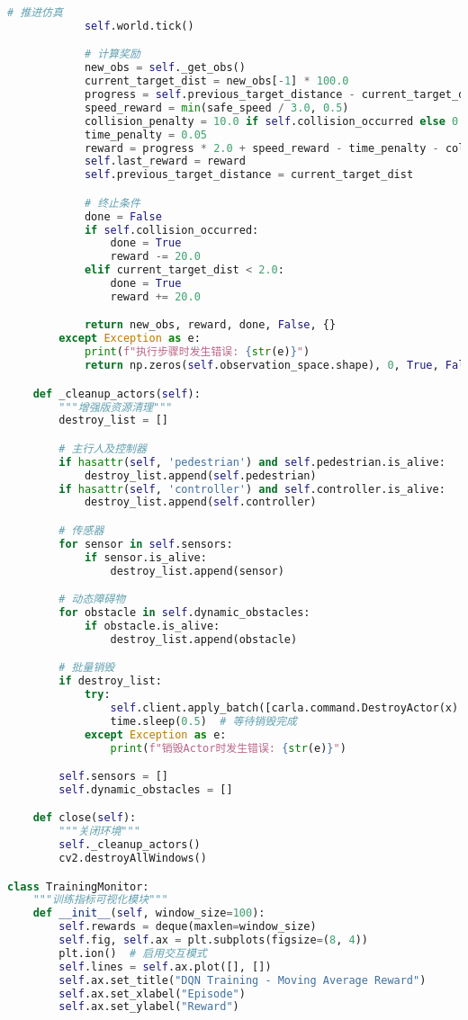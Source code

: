 \begin{lstlisting}[language=Python]
            # 推进仿真
            self.world.tick()

            # 计算奖励
            new_obs = self._get_obs()
            current_target_dist = new_obs[-1] * 100.0
            progress = self.previous_target_distance - current_target_dist
            speed_reward = min(safe_speed / 3.0, 0.5)
            collision_penalty = 10.0 if self.collision_occurred else 0.0
            time_penalty = 0.05
            reward = progress * 2.0 + speed_reward - time_penalty - collision_penalty
            self.last_reward = reward
            self.previous_target_distance = current_target_dist

            # 终止条件
            done = False
            if self.collision_occurred:
                done = True
                reward -= 20.0
            elif current_target_dist < 2.0:
                done = True
                reward += 20.0

            return new_obs, reward, done, False, {}
        except Exception as e:
            print(f"执行步骤时发生错误: {str(e)}")
            return np.zeros(self.observation_space.shape), 0, True, False, {}

    def _cleanup_actors(self):
        """增强版资源清理"""
        destroy_list = []

        # 主行人及控制器
        if hasattr(self, 'pedestrian') and self.pedestrian.is_alive:
            destroy_list.append(self.pedestrian)
        if hasattr(self, 'controller') and self.controller.is_alive:
            destroy_list.append(self.controller)

        # 传感器
        for sensor in self.sensors:
            if sensor.is_alive:
                destroy_list.append(sensor)

        # 动态障碍物
        for obstacle in self.dynamic_obstacles:
            if obstacle.is_alive:
                destroy_list.append(obstacle)

        # 批量销毁
        if destroy_list:
            try:
                self.client.apply_batch([carla.command.DestroyActor(x) for x in destroy_list])
                time.sleep(0.5)  # 等待销毁完成
            except Exception as e:
                print(f"销毁Actor时发生错误: {str(e)}")

        self.sensors = []
        self.dynamic_obstacles = []

    def close(self):
        """关闭环境"""
        self._cleanup_actors()
        cv2.destroyAllWindows()

class TrainingMonitor:
    """训练指标可视化模块"""
    def __init__(self, window_size=100):
        self.rewards = deque(maxlen=window_size)
        self.fig, self.ax = plt.subplots(figsize=(8, 4))
        plt.ion()  # 启用交互模式
        self.lines = self.ax.plot([], [])
        self.ax.set_title("DQN Training - Moving Average Reward")
        self.ax.set_xlabel("Episode")
        self.ax.set_ylabel("Reward")


\end{lstlisting}
